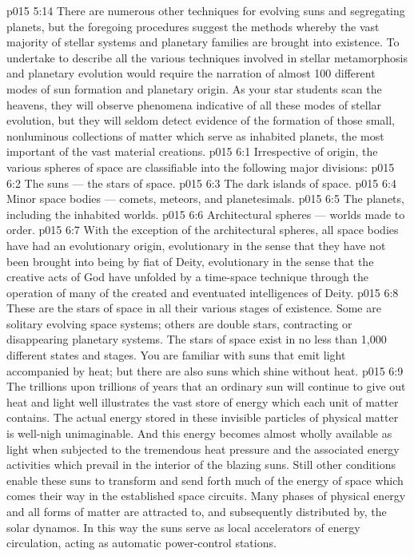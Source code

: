 \vs p015 5:14 \pc There are numerous other techniques for evolving suns and segregating planets, but the foregoing procedures suggest the methods whereby the vast majority of stellar systems and planetary families are brought into existence. To undertake to describe all the various techniques involved in stellar metamorphosis and planetary evolution would require the narration of almost 100 different modes of sun formation and planetary origin. As your star students scan the heavens, they will observe phenomena indicative of all these modes of stellar evolution, but they will seldom detect evidence of the formation of those small, nonluminous collections of matter which serve as inhabited planets, the most important of the vast material creations.
\vs p015 6:1 Irrespective of origin, the various spheres of space are classifiable into the following major divisions:
\vs p015 6:2 \bibnobreakspace The suns --- the stars of space.
\vs p015 6:3 \bibnobreakspace The dark islands of space.
\vs p015 6:4 \bibnobreakspace Minor space bodies --- comets, meteors, and planetesimals.
\vs p015 6:5 \bibnobreakspace The planets, including the inhabited worlds.
\vs p015 6:6 \bibnobreakspace Architectural spheres --- worlds made to order.
\vs p015 6:7 \pc With the exception of the architectural spheres, all space bodies have had an evolutionary origin, evolutionary in the sense that they have not been brought into being by fiat of Deity, evolutionary in the sense that the creative acts of God have unfolded by a time\hyp{}space technique through the operation of many of the created and eventuated intelligences of Deity.
\vs p015 6:8 \pc {} These are the stars of space in all their various stages of existence. Some are solitary evolving space systems; others are double stars, contracting or disappearing planetary systems. The stars of space exist in no less than 1,000 different states and stages. You are familiar with suns that emit light accompanied by heat; but there are also suns which shine without heat.
\vs p015 6:9 The trillions upon trillions of years that an ordinary sun will continue to give out heat and light well illustrates the vast store of energy which each unit of matter contains. The actual energy stored in these invisible particles of physical matter is well\hyp{}nigh unimaginable. And this energy becomes almost wholly available as light when subjected to the tremendous heat pressure and the associated energy activities which prevail in the interior of the blazing suns. Still other conditions enable these suns to transform and send forth much of the energy of space which comes their way in the established space circuits. Many phases of physical energy and all forms of matter are attracted to, and subsequently distributed by, the solar dynamos. In this way the suns serve as local accelerators of energy circulation, acting as automatic power\hyp{}control stations.
